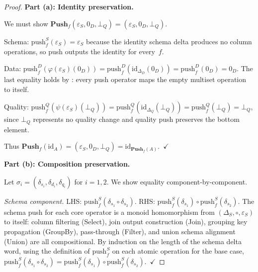 \documentclass[11pt,a4paper]{article}
\theoremstyle{definition}
\newcommand{\DeltaS}{\Delta_{\!S}}
\newcommand{\DeltaD}{\Delta_{\!D}}
\newcommand{\DeltaQ}{\Delta_{\!Q}}
\newcommand{\epsS}{\varepsilon_S}
\newcommand{\zeroD}{0_D}
\newcommand{\botQ}{\bot_Q}
\newcommand{\push}{\mathrm{push}}
\begin{document}
\begin{proof}
\textbf{Part (a): Identity preservation.}

We must show $\mathbf{Push}_f(\epsS, \zeroD, \botQ) = (\epsS, \zeroD, \botQ)$.

Schema: $\push_f^S(\epsS) = \epsS$ because the identity schema delta
produces no column operations, so push outputs the identity for every~$f$.

Data: $\push_f^D(\varphi(\epsS)(\zeroD)) = \push_f^D(\mathrm{id}_{\DeltaD}(\zeroD))
= \push_f^D(\zeroD) = \zeroD$.
The last equality holds by : every push operator maps the
empty multiset operation to itself.

Quality: $\push_f^Q(\psi(\epsS)(\botQ)) = \push_f^Q(\mathrm{id}_{\DeltaQ}(\botQ))
= \push_f^Q(\botQ) = \botQ$,
since $\botQ$ represents no quality change and quality push preserves the
bottom element.

Thus $\mathbf{Push}_f(\mathrm{id}_A) = (\epsS, \zeroD, \botQ) =
\mathrm{id}_{\mathbf{Push}_f(A)}$.~$\checkmark$

\textbf{Part (b): Composition preservation.}

Let $\sigma_i = (\delta_{s_i}, \delta_{d_i}, \delta_{q_i})$ for $i = 1, 2$.
We show equality component-by-component.

\emph{Schema component.}
LHS: $\push_f^S(\delta_{s_1} \circ \delta_{s_2})$.
RHS: $\push_f^S(\delta_{s_1}) \circ \push_f^S(\delta_{s_2})$.
The schema push for each core operator is a monoid homomorphism from $(\DeltaS,
\circ, \epsS)$ to itself: column filtering (Select), join output construction
(Join), grouping key propagation (GroupBy), pass-through (Filter), and union
schema alignment (Union) are all compositional.
By induction on the length of the schema delta word, using the definition of
$\push_f^S$ on each atomic operation for the base case,
$\push_f^S(\delta_{s_1} \circ \delta_{s_2}) = \push_f^S(\delta_{s_1})
\circ \push_f^S(\delta_{s_2})$.~$\checkmark$


\end{proof}
\end{document}
